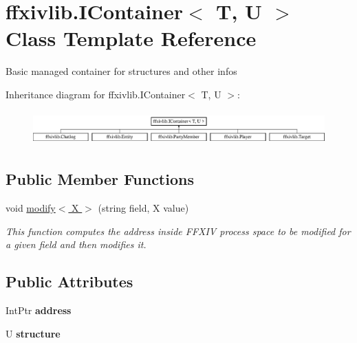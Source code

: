 \hypertarget{classffxivlib_1_1_i_container_3_01_t_00_01_u_01_4}{\section{ffxivlib.\-I\-Container$<$ T, U $>$ Class Template Reference}
\label{classffxivlib_1_1_i_container_3_01_t_00_01_u_01_4}
}


Basic managed container for structures and other infos  


Inheritance diagram for ffxivlib.\-I\-Container$<$ T, U $>$\-:\begin{figure}[H]
\begin{center}
\leavevmode
\includegraphics[height=1.341317cm]{classffxivlib_1_1_i_container_3_01_t_00_01_u_01_4}
\end{center}
\end{figure}
\subsection*{Public Member Functions}
\begin{DoxyCompactItemize}
\item 
void \hyperlink{classffxivlib_1_1_i_container_3_01_t_00_01_u_01_4_ae9081b3163d43d4d655dc72ea50b7a3d}{modify$<$ X $>$} (string field, X value)
\begin{DoxyCompactList}\small\item\em This function computes the address inside F\-F\-X\-I\-V process space to be modified for a given field and then modifies it. \end{DoxyCompactList}\end{DoxyCompactItemize}
\subsection*{Public Attributes}
\begin{DoxyCompactItemize}
\item 
\hypertarget{classffxivlib_1_1_i_container_3_01_t_00_01_u_01_4_a4c25b42d6bd8f3114947d137bea657c1}{Int\-Ptr {\bfseries address}}\label{classffxivlib_1_1_i_container_3_01_t_00_01_u_01_4_a4c25b42d6bd8f3114947d137bea657c1}

\item 
\hypertarget{classffxivlib_1_1_i_container_3_01_t_00_01_u_01_4_a4a077a13df5c84a292c1c03e05bc9ac7}{U {\bfseries structure}}\label{classffxivlib_1_1_i_container_3_01_t_00_01_u_01_4_a4a077a13df5c84a292c1c03e05bc9ac7}

\end{DoxyCompactItemize}


